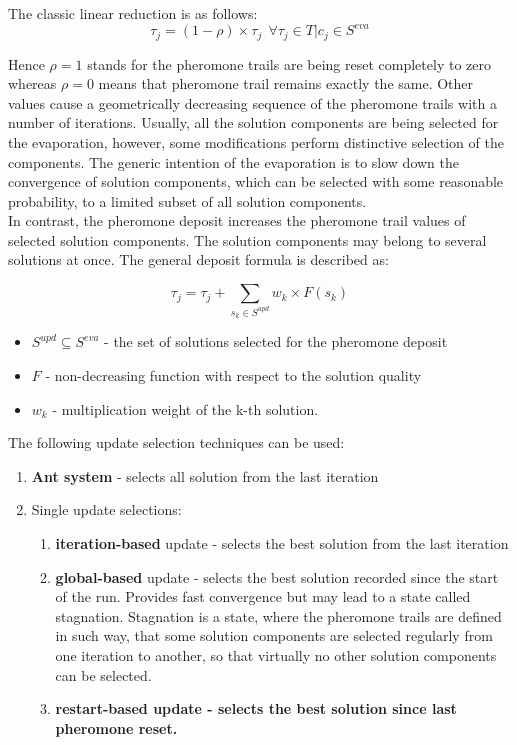 \documentclass[11pt,a4paper,oneside]{book}
\begin{document}
The classic linear reduction is as follows:
\begin{equation}
\tau_j = (1-\rho) \times \tau_j \ \ \forall  \tau_j \in T | c_j \in S^{eva}
\end{equation}

Hence $\rho=1$ stands for the pheromone trails are being reset completely to zero whereas $\rho=0$ means that pheromone trail remains exactly the same. Other values cause a geometrically decreasing sequence of the pheromone trails with a number of iterations. Usually, all the solution components are being selected for the evaporation, however, some modifications perform distinctive selection of the components. The generic intention of the evaporation is to slow down the convergence of solution components, which can be selected with some reasonable probability, to a limited subset of all solution components. \\

In contrast, the pheromone deposit increases the pheromone trail values of selected solution components. The solution components may belong to several solutions at once. The general deposit formula is described as:

\begin{equation}
\tau_j = \tau_j + \sum \limits_{s_k \in S^{upd}} w_k \times F(s_k)
\end{equation} 

\begin{itemize}
\item $S^{upd} \subseteq S^{eva}$ - the set of solutions selected for the pheromone deposit
\item $F$ - non-decreasing function with respect to the solution quality
\item $w_k$ - multiplication weight of the k-th solution.  
\end{itemize}

The following update selection techniques can be used:
\begin{enumerate}
\item {\textbf{Ant system} - selects all solution from the last iteration}
\item {Single update selections:}
\begin{enumerate}
\item {\textbf{iteration-based} update - selects the best solution from the last iteration}
\item {\textbf{global-based} update - selects the best solution recorded since the start of the run. Provides fast convergence but may lead to a state called stagnation. Stagnation is a state, where the pheromone trails are defined in such way, that some solution components are selected regularly from one iteration to another, so that virtually no other solution components can be selected.}
\item \textbf{{restart-based} update - selects the best solution since last pheromone reset.}
\end{enumerate}
\end{enumerate}
\end{document}
